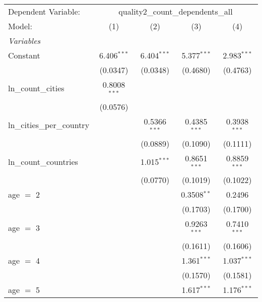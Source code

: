 \begingroup
\centering
\begin{tabular}{lcccc}
   \tabularnewline \midrule \midrule
   Dependent Variable: & \multicolumn{4}{c}{quality2\_count\_dependents\_all}\\
   Model:                               & (1)            & (2)            & (3)            & (4)\\  
   \midrule
   \emph{Variables}\\
   Constant                             & 6.406$^{***}$  & 6.404$^{***}$  & 5.377$^{***}$  & 2.983$^{***}$\\   
                                        & (0.0347)       & (0.0348)       & (0.4680)       & (0.4763)\\   
   ln\_count\_cities                    & 0.8008$^{***}$ &                &                &   \\   
                                        & (0.0576)       &                &                &   \\   
   ln\_cities\_per\_country             &                & 0.5366$^{***}$ & 0.4385$^{***}$ & 0.3938$^{***}$\\   
                                        &                & (0.0889)       & (0.1090)       & (0.1111)\\   
   ln\_count\_countries                 &                & 1.015$^{***}$  & 0.8651$^{***}$ & 0.8859$^{***}$\\   
                                        &                & (0.0770)       & (0.1019)       & (0.1022)\\   
   age $=$ 2                            &                &                & 0.3508$^{**}$  & 0.2496\\   
                                        &                &                & (0.1703)       & (0.1700)\\   
   age $=$ 3                            &                &                & 0.9263$^{***}$ & 0.7410$^{***}$\\   
                                        &                &                & (0.1611)       & (0.1606)\\   
   age $=$ 4                            &                &                & 1.361$^{***}$  & 1.037$^{***}$\\   
                                        &                &                & (0.1570)       & (0.1581)\\   
   age $=$ 5                            &                &                & 1.617$^{***}$  & 1.176$^{***}$\\   

\end{tabular}
